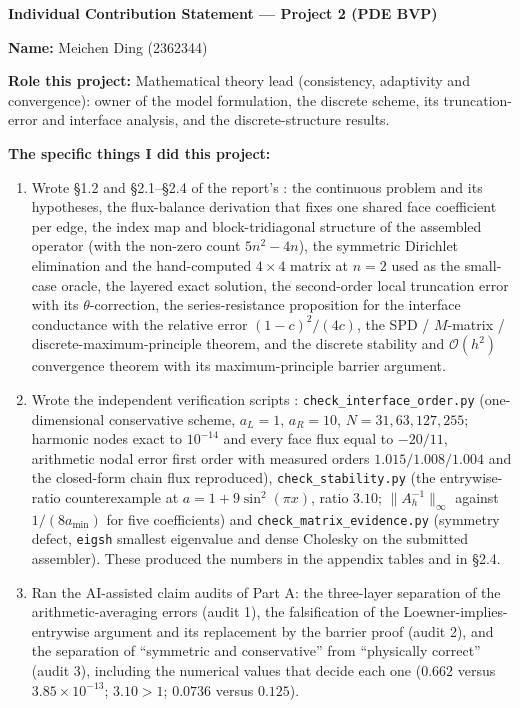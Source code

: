 \begin{formbox}\small
\textbf{Individual Contribution Statement --- Project 2 (PDE BVP)}

\textbf{Name:} Meichen Ding (2362344)

\textbf{Role this project:} Mathematical theory lead (consistency, adaptivity
and convergence): owner of the model formulation, the discrete scheme, its
truncation-error and interface analysis, and the discrete-structure results.

\textbf{The specific things I did this project:}
\begin{enumerate}[leftmargin=1.4em,itemsep=0.15em]
  \item
  Wrote \S1.2 and \S2.1--\S2.4 of the report's : the continuous
  problem and its hypotheses, the flux-balance derivation that fixes
  one shared face coefficient per edge, the index map and block-tridiagonal
  structure of the assembled operator (with the non-zero count $5n^2-4n$), the
  symmetric Dirichlet elimination and the hand-computed $4\times4$ matrix at
  $n=2$ used as the small-case oracle, the layered exact solution, the
  second-order local truncation error with its $\theta$-correction, the
  series-resistance proposition for the interface conductance with the relative
  error $(1-c)^2/(4c)$, the SPD / $M$-matrix / discrete-maximum-principle
  theorem, and the discrete stability and $\mathcal{O}(h^2)$ convergence theorem
  with its maximum-principle barrier argument.
  \item
  Wrote the independent verification scripts :
  \texttt{check\_interface\_order.py} (one-dimensional conservative scheme,
  $a_L=1$, $a_R=10$, $N=31,63,127,255$; harmonic nodes exact to $10^{-14}$ and
  every face flux equal to $-20/11$, arithmetic nodal error first order with
  measured orders $1.015/1.008/1.004$ and the closed-form chain flux
  reproduced), \texttt{check\_stability.py} (the entrywise-ratio counterexample
  at $a=1+9\sin^2(\pi x)$, ratio $3.10$; $\|A_h^{-1}\|_\infty$ against
  $1/(8a_{\min})$ for five coefficients) and
  \texttt{check\_matrix\_evidence.py} (symmetry defect, \texttt{eigsh} smallest
  eigenvalue and dense Cholesky on the submitted assembler). These produced the
  numbers in the appendix tables and in \S2.4.
  \item
  Ran the AI-assisted claim audits of Part A: the three-layer separation of the
  arithmetic-averaging errors (audit 1), the falsification of the
  Loewner-implies-entrywise argument and its replacement by the barrier proof
  (audit 2), and the separation of ``symmetric and conservative'' from
  ``physically correct'' (audit 3), including the numerical values that decide
  each one ($0.662$ versus $3.85\times10^{-13}$; $3.10>1$; $0.0736$ versus
  $0.125$).
\end{enumerate}


\end{formbox}
